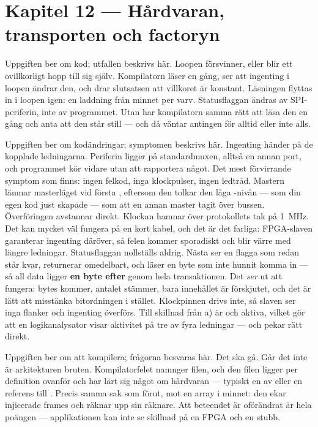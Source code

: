 \section*{Kapitel 12 --- Hårdvaran, transporten och factoryn}

Uppgiften ber om kod; utfallen beskrivs här.
 Loopen försvinner, eller blir ett ovillkorligt hopp till sig själv. Kompilatorn läser
 en gång, ser att ingenting i loopen ändrar den, och drar slutsatsen att villkoret är
konstant.
 Läsningen flyttas in i loopen igen: en laddning från minnet per varv.
 Statusflaggan ändras av SPI-periferin, inte av programmet. Utan  har
kompilatorn samma rätt att läsa den en gång och anta att den står still --- och då väntar
 antingen för alltid eller inte alls.

Uppgiften ber om kodändringar; symptomen beskrivs här.
 Ingenting händer på de kopplade ledningarna. Periferin ligger på standardmuxen, alltså en
annan port, och programmet kör vidare utan att rapportera något. Det mest förvirrande symptom som
finns: ingen felkod, inga klockpulser, ingen ledtråd.
 Mastern lämnar masterläget vid första , eftersom den tolkar den låga
-nivån --- som din egen kod just skapade --- som att en annan master tagit över bussen.
Överföringen avstannar direkt.
 Klockan hamnar över protokollets tak på 1~MHz. Det kan mycket väl fungera på en kort
kabel, och det är det farliga: FPGA-slaven garanterar ingenting däröver, så felen kommer
sporadiskt och blir värre med längre ledningar.
 Statusflaggan nollställs aldrig. Nästa  ser en flagga som redan står kvar,
returnerar omedelbart, och läser en byte som inte hunnit komma in --- så all data ligger
\textbf{en byte efter} genom hela transaktionen. Det \emph{ser} ut att fungera: bytes kommer,
antalet stämmer, bara innehållet är förskjutet, och det är lätt att misstänka bitordningen i
stället.
 Klockpinnen drivs inte, så slaven ser inga flanker och ingenting överförs. Till skillnad
från a) är  och  aktiva, vilket gör att en logikanalysator visar aktivitet på
tre av fyra ledningar --- och pekar rätt direkt.

Uppgiften ber om att kompilera; frågorna besvaras här.
 Det ska gå. Går det inte är arkitekturen bruten.
 Kompilatorfelet namnger filen, och den filen ligger per definition ovanför
 och har lärt sig något om hårdvaran --- typiskt en 
av  eller en referens till .
 Precis samma sak som förut, mot en array i minnet: den ekar injicerade frames och räknar
upp sin räknare. Att beteendet är oförändrat är hela poängen --- applikationen kan inte se
skillnad på en FPGA och en stubb.


